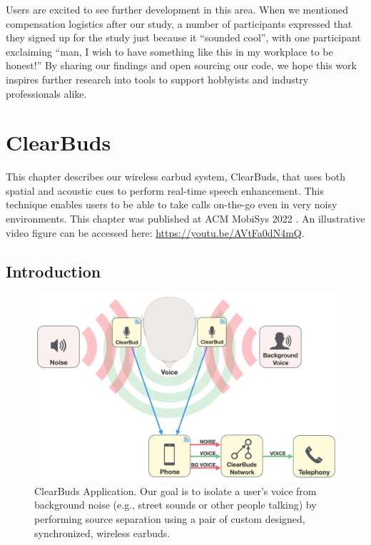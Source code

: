 \documentclass [11pt, proquest] {uwthesis}[2020/02/24]
\begin{document}
Users are excited to see further development in this area. When we mentioned compensation logistics after our study, a number of participants expressed that they signed up for the study just because it ``sounded cool'', with one participant exclaiming ``man, I wish to have something like this in my workplace to be honest!''
By sharing our findings and open sourcing our code, we hope this work inspires further research into tools to support hobbyists and industry professionals alike.





\chapter{ClearBuds}

This chapter describes our wireless earbud system, ClearBuds, that uses both spatial and acoustic cues to perform real-time speech enhancement. This technique enables users to be able to take calls on-the-go even in very noisy environments. This chapter was published at ACM MobiSys 2022 \cite{10.1145/3498361.3538933}. An illustrative video figure can be accessed here: \url{https://youtu.be/AVtFa0dN4mQ}.

\section{Introduction}

\begin{figure}
\centering
 \includegraphics[width=0.75\linewidth]{CB_figures/flow-diagram-6.png}
\vskip -0.1in
\caption{{ ClearBuds Application.  Our goal is to isolate a user's voice from background noise (e.g., street sounds or other people talking) by performing source separation  using a pair of custom designed, synchronized, wireless earbuds.}}
\label{fig:block_diagram}
\vskip -0.15in
\end{figure}
\end{document}
